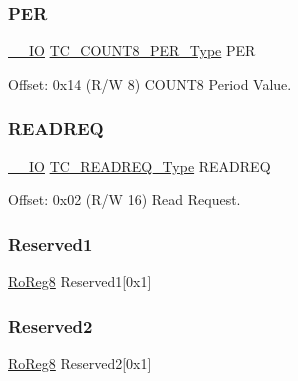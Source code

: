\mbox{\label{struct_tc_count8_ae94ea0925cc8635e20b7da2f6b7da943}} 
\subsubsection{\texorpdfstring{PER}{PER}}
{\footnotesize\ttfamily \mbox{\hyperlink{core__cm0plus_8h_aec43007d9998a0a0e01faede4133d6be}{\+\_\+\+\_\+\+IO}} \mbox{\hyperlink{union_t_c___c_o_u_n_t8___p_e_r___type}{T\+C\+\_\+\+C\+O\+U\+N\+T8\+\_\+\+P\+E\+R\+\_\+\+Type}} P\+ER}



Offset\+: 0x14 (R/W 8) C\+O\+U\+N\+T8 Period Value. 

\mbox{\label{struct_tc_count8_a9cb0a3ec797bc9e4a1b1db94d2865b34}} 
\subsubsection{\texorpdfstring{READREQ}{READREQ}}
{\footnotesize\ttfamily \mbox{\hyperlink{core__cm0plus_8h_aec43007d9998a0a0e01faede4133d6be}{\+\_\+\+\_\+\+IO}} \mbox{\hyperlink{union_t_c___r_e_a_d_r_e_q___type}{T\+C\+\_\+\+R\+E\+A\+D\+R\+E\+Q\+\_\+\+Type}} R\+E\+A\+D\+R\+EQ}



Offset\+: 0x02 (R/W 16) Read Request. 

\mbox{\label{struct_tc_count8_a092866123ac46d0985136e4dca2f36f4}} 
\subsubsection{\texorpdfstring{Reserved1}{Reserved1}}
{\footnotesize\ttfamily \mbox{\hyperlink{group___s_a_m_d21_e15_a__definitions_ga0d957f1433aaf5d70e4dc2b68288442d}{Ro\+Reg8}} Reserved1\mbox{[}0x1\mbox{]}}

\mbox{\label{struct_tc_count8_a99ee50bfa44e107c16a546d778dcdcc7}} 
\subsubsection{\texorpdfstring{Reserved2}{Reserved2}}
{\footnotesize\ttfamily \mbox{\hyperlink{group___s_a_m_d21_e15_a__definitions_ga0d957f1433aaf5d70e4dc2b68288442d}{Ro\+Reg8}} Reserved2\mbox{[}0x1\mbox{]}}

